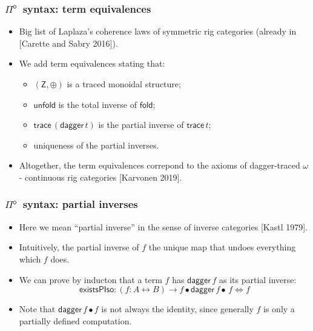 \documentclass[12pt,t]{beamer}
\newcommand{\Pio}{\ensuremath{\mathsf{\Pi}^{\mathsf{o}}}}
\newcommand{\lr}{\longleftrightarrow}
\newcommand{\fold}{\mathsf{fold}}
\newcommand{\unfold}{\mathsf{unfold}}
\newcommand{\trace}{\ensuremath{\mathsf{trace}}}
\newcommand{\Z}{\mathsf{Z}}
\newcommand{\LR}{\iff}
\renewcommand{\dagger}{\mathsf{dagger}}
\begin{document}
\begin{frame}
  \frametitle{\Pio\ syntax: term equivalences}
  \begin{itemize}    
  \item Big list of Laplaza's coherence laws of symmetric rig categories (already
    in [Carette and Sabry 2016]).
  \item We add term equivalences stating that:
    \begin{itemize}
    \item $(\Z,\oplus)$ is a traced monoidal structure;
    \item $\unfold$ is the total inverse of $\fold$;
    \item $\trace\,(\dagger \,t)$ is the partial inverse of $\trace\,t$;
    \item uniqueness of the partial inverses.
    \end{itemize}

    \vspace{\fill}
  \item Altogether, the term equivalences correpond to the axioms of
    dagger-traced $\omega$- continuous rig categories [Karvonen 2019].
    \end{itemize}
\end{frame}

\begin{frame}
  \frametitle{\Pio\ syntax: partial inverses}
  \begin{itemize}
  \item Here we mean ``partial inverse'' in the sense of inverse
    categories [Kastl 1979].
  \item Intuitively, the partial inverse of $f$ the unique map that
    undoes everything which $f$ does.
  \item We can prove by inducton that a term $f$ has $\dagger\,f$ as
    its partial inverse:
    \[
    \mathsf{existsPIso} : (f : A \lr B) \to f \bullet \dagger\,f
    \bullet\,f \LR f
    \]
    \vspace{\fill}
  \item Note that $\dagger \,f \bullet f$ is not always the identity,
    since generally $f$ is only a partially defined computation.
  \end{itemize}
\end{frame}
\end{document}
